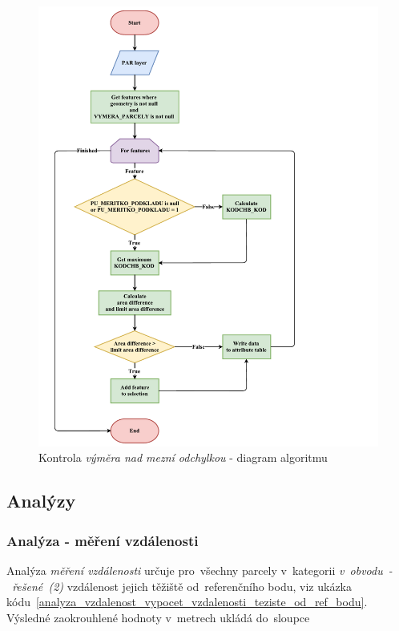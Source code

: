 	\begin{figure}[H]
		\centering
		\includegraphics[width=1.2\textwidth]{./pictures/vymera.pdf}
		\caption[Kontrola \textit{výměra nad mezní odchylkou} - diagram algoritmu]{Kontrola \textit{výměra nad mezní odchylkou} - diagram algoritmu}
		\label{fig:diagram_vymera}
 	\end{figure}

\subsection{Analýzy}
\label{analyzy}

\subsubsection{Analýza - měření vzdálenosti}
\label{analyza_vzdalenosti}

Analýza \textit{měření vzdálenosti} určuje pro~všechny parcely v~kategorii \textit{v~obvodu~-~řešené~(2)} vzdálenost jejich těžiště od~referenčního bodu, viz ukázka kódu~\ref{analyza_vzdalenost_vypocet_vzdalenosti_teziste_od_ref_bodu}. Výsledné zaokrouhlené hodnoty v~metrech ukládá do~sloupce \texttt{}

